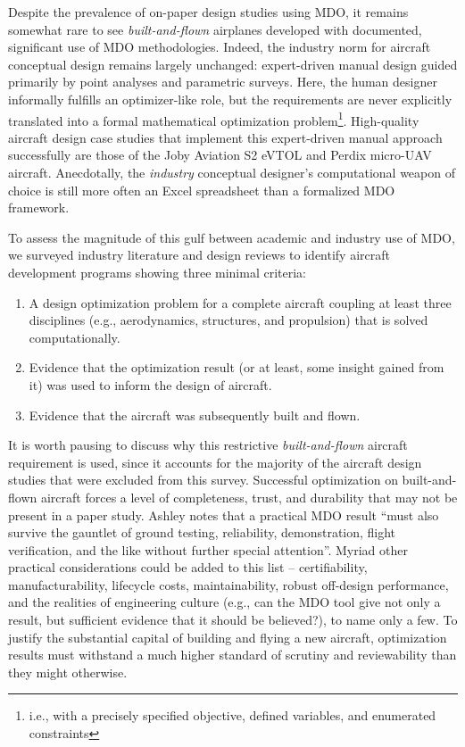 \documentclass[12pt,vi,oneside]{report}
\begin{document}
    Despite the prevalence of on-paper design studies using MDO, it remains somewhat rare to see \textit{built-and-flown} airplanes developed with documented, significant use of MDO methodologies. Indeed, the industry norm for aircraft conceptual design remains largely unchanged: expert-driven manual design guided primarily by point analyses and parametric surveys. Here, the human designer informally fulfills an optimizer-like role, but the requirements are never explicitly translated into a formal mathematical optimization problem\footnote{i.e., with a precisely specified objective, defined variables, and enumerated constraints}. High-quality aircraft design case studies that implement this expert-driven manual approach successfully are those of the Joby Aviation S2 eVTOL \cite{stoll_conceptual_2014} and Perdix micro-UAV \cite{tao_design_2012} aircraft. Anecdotally, the \textit{industry} conceptual designer's computational weapon of choice is still more often an Excel spreadsheet than a formalized MDO framework.

    To assess the magnitude of this gulf between academic and industry use of MDO, we surveyed industry literature and design reviews to identify aircraft development programs showing three minimal criteria:
    \begin{enumerate}[noitemsep]
        \item A design optimization problem for a complete aircraft coupling at least three disciplines (e.g., aerodynamics, structures, and propulsion) that is solved computationally.
        \item Evidence that the optimization result (or at least, some insight gained from it) was used to inform the design of aircraft.
        \item Evidence that the aircraft was subsequently built and flown.
    \end{enumerate}

    \noindent It is worth pausing to discuss why this restrictive \textit{built-and-flown} aircraft requirement is used, since it accounts for the majority of the aircraft design studies that were excluded from this survey. Successful optimization on built-and-flown aircraft forces a level of completeness, trust, and durability that may not be present in a paper study. Ashley notes that a practical MDO result ``must also survive the gauntlet of ground testing, reliability, demonstration, flight verification, and the like without further special attention''. \cite{ashley_making_1982} Myriad other practical considerations could be added to this list -- certifiability, manufacturability, lifecycle costs, maintainability, robust off-design performance, and the realities of engineering culture (e.g., can the MDO tool give not only a result, but sufficient evidence that it should be believed?), to name only a few. To justify the substantial capital of building and flying a new aircraft, optimization results must withstand a much higher standard of scrutiny and reviewability than they might otherwise.
\end{document}
